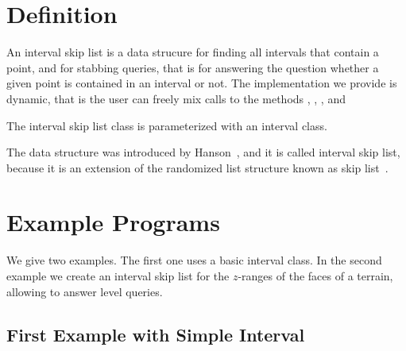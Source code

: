 
\ccParDims






\section{Definition}
  
An interval skip list is a data strucure for finding all intervals 
that contain a point, and for stabbing queries, that is for answering 
the question whether a given point is contained in an interval or not. 
The implementation we provide is dynamic, that is the user can freely
mix calls  to the methods , , 
, and 

The interval skip list class is parameterized with an interval class.

The data structure was introduced by Hanson~\cite{h-islds-91}, and it is called
interval skip list, because it is an extension of the randomized list
structure known as skip list~\cite{p-slpab-90}.
 
\section{Example Programs}
\label{sectionIntervalskiplistExamples}

We give two examples. The first one uses a basic interval class.  In
the second example we create an interval skip list for the $z$-ranges
of the faces of a terrain, allowing to answer level queries.

\subsection{First Example with Simple Interval}

